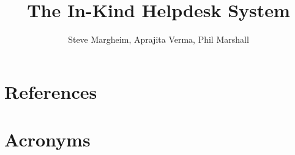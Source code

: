 \documentclass[DM,authoryear,toc]{lsstdoc}
\title{The In-Kind Helpdesk System}
\author{%
Steve Margheim, 
Aprajita Verma,
Phil Marshall
}
\date{\vcsDate}
\begin{document}
\maketitle


\appendix
\section{References} \label{sec:bib}
\renewcommand{\refname}{} %


\section{Acronyms} \label{sec:acronyms}

\end{document}
